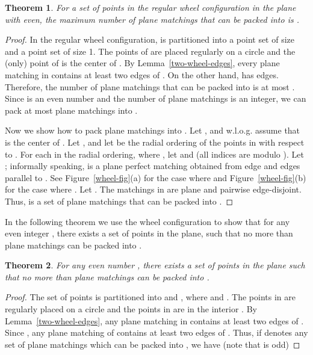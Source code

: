 \documentclass[11pt,a4paper]{article}
\newcommand{\CH}[1]{\text{}}
\newtheorem{theorem}{Theorem}
\begin{document}
\begin{theorem}
\label{wheel}
For a set  of  points in the regular wheel configuration in the plane with  even, the maximum number of plane matchings that can be packed into  is .
\end{theorem}
\begin{proof}
In the regular wheel configuration,  is partitioned into a point set  of size  and a point set  of size 1. The points of  are placed regularly on a circle  and the (only) point of  is the center of . By Lemma~\ref{two-wheel-edges}, every plane matching in  contains at least two edges of \CH{P}. On the other hand, \CH{P} has  edges. Therefore, the number of plane matchings that can be packed into  is at most . Since  is an even number and the number of plane matchings is an integer, we can pack at most  plane matchings into .

Now we show how to pack  plane matchings into .
Let , and w.l.o.g. assume that  is the center of . Let , and let  be the radial ordering of the points in  with respect to . For each  in the radial ordering, where , let  and  (all indices are modulo ). Let ; informally speaking,  is a plane perfect matching obtained from edge  and edges parallel to . See Figure~\ref{wheel-fig}(a) for the case where  and Figure~\ref{wheel-fig}(b) for the case where . Let . The matchings in  are plane and pairwise edge-disjoint. Thus,  is a set of  plane matchings that can be packed into . 
\end{proof}

In the following theorem we use the wheel configuration to show that for any even integer , there exists a set  of  points in the plane, such that no more than  plane matchings can be packed into . 

\begin{theorem}
\label{n-over-3-thr}
For any even number , there exists a set  of  points in the plane such that no more than  plane matchings can be packed into .
\end{theorem}
\begin{proof}
The set  of  points is partitioned into  and , where  and . The points in  are regularly placed on a circle  and the points in  are in the interior . By Lemma~\ref{two-wheel-edges}, any plane matching in  contains at least two edges of \CH{P}.
Since , any plane matching of  contains at least two edges of \CH{X}. Thus, if  denotes any set of plane matchings which can be packed into , we have (note that  is odd)

\end{proof}
\end{document}
